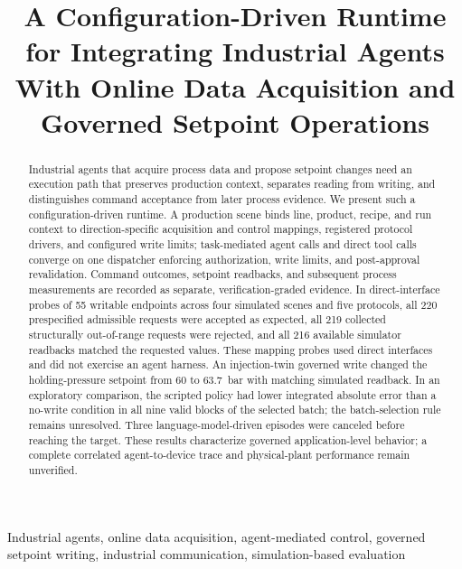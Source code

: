 \documentclass[journal]{IEEEtran}
\begin{document}

\title{A Configuration-Driven Runtime for Integrating Industrial Agents With Online Data Acquisition and Governed Setpoint Operations}

\author{}

\maketitle

\begin{abstract}
Industrial agents that acquire process data and propose setpoint changes need an execution path that preserves production context, separates reading from writing, and distinguishes command acceptance from later process evidence. We present such a configuration-driven runtime. A production scene binds line, product, recipe, and run context to direction-specific acquisition and control mappings, registered protocol drivers, and configured write limits; task-mediated agent calls and direct tool calls converge on one dispatcher enforcing authorization, write limits, and post-approval revalidation. Command outcomes, setpoint readbacks, and subsequent process measurements are recorded as separate, verification-graded evidence. In direct-interface probes of 55 writable endpoints across four simulated scenes and five protocols, all 220 prespecified admissible requests were accepted as expected, all 219 collected structurally out-of-range requests were rejected, and all 216 available simulator readbacks matched the requested values. These mapping probes used direct interfaces and did not exercise an agent harness. An injection-twin governed write changed the holding-pressure setpoint from 60 to 63.7~bar with matching simulated readback. In an exploratory comparison, the scripted policy had lower integrated absolute error than a no-write condition in all nine valid blocks of the selected batch; the batch-selection rule remains unresolved. Three language-model-driven episodes were canceled before reaching the target. These results characterize governed application-level behavior; a complete correlated agent-to-device trace and physical-plant performance remain unverified.
\end{abstract}

\begin{IEEEkeywords}
Industrial agents, online data acquisition, agent-mediated control, governed setpoint writing, industrial communication, simulation-based evaluation
\end{IEEEkeywords}
\end{document}
